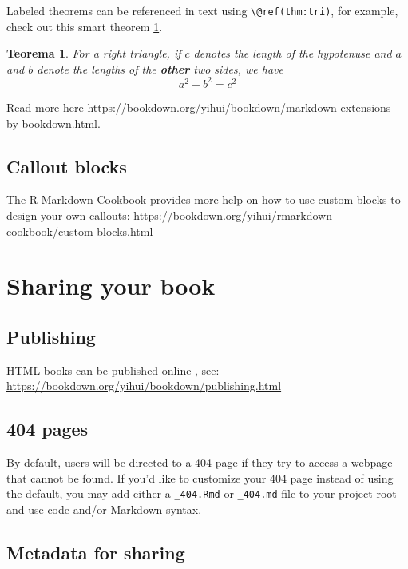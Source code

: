 \documentclass[
  11pt,
  twoside]{book}
\newtheorem{theorem}{Teorema}[chapter]
\theoremstyle{definition}
\theoremstyle{definition}
\theoremstyle{definition}
\theoremstyle{definition}
\theoremstyle{remark}
\begin{document}
Labeled theorems can be referenced in text using \texttt{\textbackslash{}@ref(thm:tri)}, for example, check out this smart theorem \ref{thm:tri}.

\begin{theorem}
\protect\hypertarget{thm:tri}{}\label{thm:tri}For a right triangle, if \(c\) denotes the \emph{length} of the hypotenuse
and \(a\) and \(b\) denote the lengths of the \textbf{other} two sides, we have
\[a^2 + b^2 = c^2\]
\end{theorem}

Read more here \url{https://bookdown.org/yihui/bookdown/markdown-extensions-by-bookdown.html}.

\hypertarget{callout-blocks}{%
\section{Callout blocks}\label{callout-blocks}}

The R Markdown Cookbook provides more help on how to use custom blocks to design your own callouts: \url{https://bookdown.org/yihui/rmarkdown-cookbook/custom-blocks.html}

\hypertarget{sharing-your-book}{%
\chapter*{Sharing your book}\label{sharing-your-book}}

\hypertarget{publishing}{%
\section{Publishing}\label{publishing}}

HTML books can be published online , see: \url{https://bookdown.org/yihui/bookdown/publishing.html}

\hypertarget{pages}{%
\section{404 pages}\label{pages}}

By default, users will be directed to a 404 page if they try to access a webpage that cannot be found. If you'd like to customize your 404 page instead of using the default, you may add either a \texttt{\_404.Rmd} or \texttt{\_404.md} file to your project root and use code and/or Markdown syntax.

\hypertarget{metadata-for-sharing}{%
\section{Metadata for sharing}\label{metadata-for-sharing}}
\end{document}
